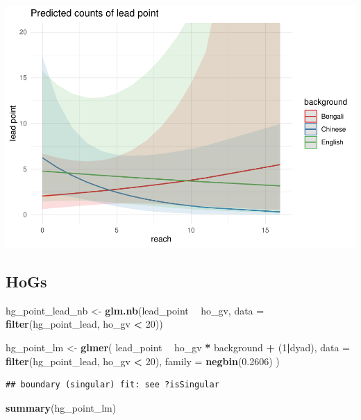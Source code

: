 \documentclass[]{article}
\newenvironment{Shaded}{\begin{snugshade}}{\end{snugshade}}
\newcommand{\DataTypeTok}[1]{\textcolor[rgb]{0.13,0.29,0.53}{#1}}
\newcommand{\DecValTok}[1]{\textcolor[rgb]{0.00,0.00,0.81}{#1}}
\newcommand{\FloatTok}[1]{\textcolor[rgb]{0.00,0.00,0.81}{#1}}
\newcommand{\KeywordTok}[1]{\textcolor[rgb]{0.13,0.29,0.53}{\textbf{#1}}}
\newcommand{\NormalTok}[1]{#1}
\newcommand{\OperatorTok}[1]{\textcolor[rgb]{0.81,0.36,0.00}{\textbf{#1}}}
\newcommand{\StringTok}[1]{\textcolor[rgb]{0.31,0.60,0.02}{#1}}
\begin{document}
\includegraphics{supplement_files/figure-latex/reach-point-plot-1.pdf}

\hypertarget{hogs}{%
\subsection{HoGs}\label{hogs}}

\begin{Shaded}
\begin{Highlighting}[]
\NormalTok{hg_point_lead_nb <-}\StringTok{ }\KeywordTok{glm.nb}\NormalTok{(lead_point }\OperatorTok{~}\StringTok{ }\NormalTok{ho_gv, }\DataTypeTok{data =} \KeywordTok{filter}\NormalTok{(hg_point_lead, ho_gv }\OperatorTok{<}\StringTok{ }\DecValTok{20}\NormalTok{))}

\NormalTok{hg_point_lm <-}\StringTok{ }\KeywordTok{glmer}\NormalTok{(}
\NormalTok{  lead_point }\OperatorTok{~}
\StringTok{    }\NormalTok{ho_gv }\OperatorTok{*}
\StringTok{    }\NormalTok{background }\OperatorTok{+}
\StringTok{    }\NormalTok{(}\DecValTok{1}\OperatorTok{|}\NormalTok{dyad),}
  \DataTypeTok{data =} \KeywordTok{filter}\NormalTok{(hg_point_lead, ho_gv }\OperatorTok{<}\StringTok{ }\DecValTok{20}\NormalTok{),}
  \DataTypeTok{family =} \KeywordTok{negbin}\NormalTok{(}\FloatTok{0.2606}\NormalTok{)}
\NormalTok{)}
\end{Highlighting}
\end{Shaded}

\begin{verbatim}
## boundary (singular) fit: see ?isSingular
\end{verbatim}

\begin{Shaded}
\begin{Highlighting}[]
\KeywordTok{summary}\NormalTok{(hg_point_lm)}
\end{Highlighting}
\end{Shaded}
\end{document}
